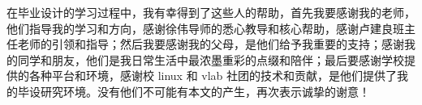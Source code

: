 
\begin{acknowledgements}

在毕业设计的学习过程中，我有幸得到了这些人的帮助，首先我要感谢我的老师，他们指导我的学习和方向，感谢徐伟导师的悉心教导和核心帮助，感谢卢建良班主任老师的引领和指导；然后我要感谢我的父母，是他们给予我重要的支持；感谢我的同学和朋友，他们是我日常生活中最浓墨重彩的点缀和陪伴；最后要感谢学校提供的各种平台和环境，感谢校 linux 和 vlab 社团的技术和贡献，是他们提供了我的毕设研究环境。没有他们不可能有本文的产生，再次表示诚挚的谢意！


\end{acknowledgements}
